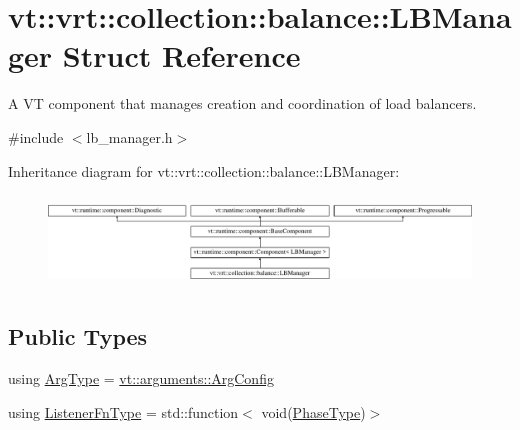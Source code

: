 \hypertarget{structvt_1_1vrt_1_1collection_1_1balance_1_1_l_b_manager}{}\section{vt\+:\+:vrt\+:\+:collection\+:\+:balance\+:\+:L\+B\+Manager Struct Reference}
\label{structvt_1_1vrt_1_1collection_1_1balance_1_1_l_b_manager}


A VT component that manages creation and coordination of load balancers.  




{\ttfamily \#include $<$lb\+\_\+manager.\+h$>$}

Inheritance diagram for vt\+:\+:vrt\+:\+:collection\+:\+:balance\+:\+:L\+B\+Manager\+:\begin{figure}[H]
\begin{center}
\leavevmode
\includegraphics[height=2.464246cm]{structvt_1_1vrt_1_1collection_1_1balance_1_1_l_b_manager}
\end{center}
\end{figure}
\subsection*{Public Types}
\begin{DoxyCompactItemize}
\item 
using \hyperlink{structvt_1_1vrt_1_1collection_1_1balance_1_1_l_b_manager_a25c1321de5a8a52b7c2c5d0d400d55d4}{Arg\+Type} = \hyperlink{structvt_1_1arguments_1_1_arg_config}{vt\+::arguments\+::\+Arg\+Config}
\item 
using \hyperlink{structvt_1_1vrt_1_1collection_1_1balance_1_1_l_b_manager_a1bb65b50c7cefb8c139a9f40a83ca18b}{Listener\+Fn\+Type} = std\+::function$<$ void(\hyperlink{namespacevt_a46ce6733d5cdbd735d561b7b4029f6d7}{Phase\+Type})$>$
\end{DoxyCompactItemize}
